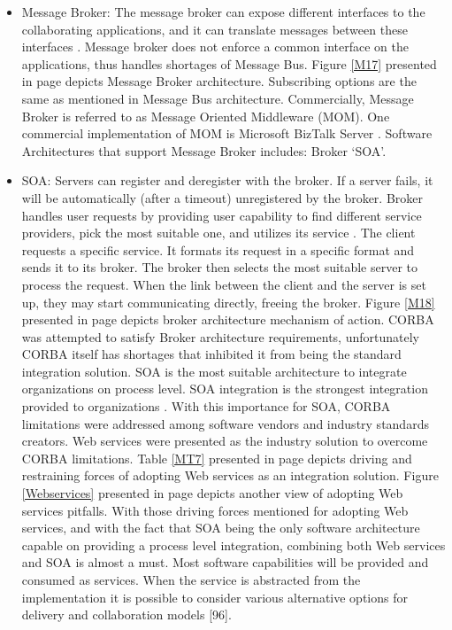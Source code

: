 \documentclass[12pt,a4paper,final,twoside,onecolumn,titlepage]{book}
\begin{document}
\begin{itemize}
\begin{itemize}
\item Message Broker: The message broker can expose different interfaces to the collaborating applications, and it can translate messages between these interfaces \cite{M26}. Message broker does not enforce a common interface on the applications, thus handles shortages of Message Bus. Figure \ref{M17} presented in page \pageref{M17} depicts Message Broker architecture. Subscribing options are the same as mentioned in Message Bus architecture. Commercially, Message Broker is referred to as Message Oriented Middleware (MOM). One commercial implementation of MOM is Microsoft BizTalk Server \cite{M56}. Software Architectures that support Message Broker includes: Broker ‘\gls{SOA}’.
\item \gls{SOA}: Servers can register and deregister with the broker. If a server fails, it will be automatically (after a timeout) unregistered by the broker. Broker handles user requests by providing user capability to find different service providers, pick the most suitable one, and utilizes its service \cite{M10}. The client requests a specific service. It formats its request in a specific format and sends it to its broker. The broker then selects the most suitable server to process the request. When the link between the client and the server is set up, they may start communicating directly, freeing the broker. Figure \ref{M18} presented in page \pageref{M18} depicts broker architecture mechanism of action. \gls{CORBA} was attempted to satisfy Broker architecture requirements, unfortunately \gls{CORBA} itself has shortages that inhibited it from being the standard integration solution. \gls{SOA} is the most suitable architecture to integrate organizations on process level. \gls{SOA} integration is the strongest integration provided to organizations \cite{M33}. With this importance for \gls{SOA}, \gls{CORBA} limitations were addressed among software vendors and industry standards creators. Web services were presented as the industry solution to overcome \gls{CORBA} limitations. Table \ref{MT7} presented in page \pageref{MT7} depicts driving and restraining forces of adopting Web services as an integration solution. Figure \ref{Webservices} presented in page \pageref{Webservices} depicts another view of adopting Web services pitfalls. With those driving forces mentioned for adopting Web services, and with the fact that \gls{SOA} being the only software architecture capable on providing a process level integration, combining both Web services and \gls{SOA} is almost a must. Most software capabilities will be provided and consumed as services. When the service is abstracted from the implementation it is possible to consider various alternative options for delivery and collaboration models [96]. 
\end{itemize}
\end{itemize}
\end{document}
